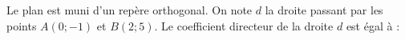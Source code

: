
Le plan est muni d'un repère orthogonal. On note $d$ la droite passant par les points $A(0 ;-1)$ et $B(2 ; 5)$. Le coefficient directeur de la droite $d$ est égal à :

\smallskip

